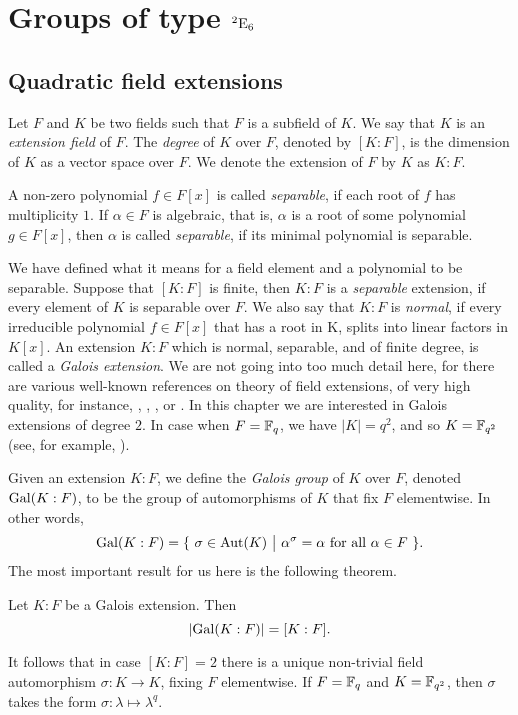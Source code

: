 \chapter{Groups of type ${}^2\mathord{\mathrm{E}}_6$}
\ifpdf
    \graphicspath{{Chapter3/Chapter3Figs/PNG/}{Chapter3/Chapter3Figs/PDF/}{Chapter3/Chapter3Figs/}}
\else
    \graphicspath{{Chapter3/Chapter3Figs/EPS/}{Chapter3/Chapter3Figs/}}
\fi

\section{Quadratic field extensions}

Let $F$ and $K$ be two fields such that $F$ is a subfield of $K$. We say that 
$K$ is an \textit{extension field} of $F$. The \textit{degree} of $K$ over $F$, 
denoted by $[K:F]$, is the dimension of $K$ as a vector space over $F$. We denote the
extension of $F$ by $K$ as $K : F$.

A non-zero polynomial $f \in F[x]$ is called \textit{separable}, if each root of $f$ has 
multiplicity $1$. If $\alpha \in F$ is algebraic, that is, $\alpha$ is a root of some polynomial
$g \in F[x]$, then $\alpha$ is called \textit{separable}, if its minimal polynomial is separable. 

We have defined what it means for a field element and a polynomial to be separable. Suppose that
$[K:F]$ is finite, then $K : F$ is a \textit{separable} extension, if every element of $K$ is 
separable over $F$. We also say that $K : F$ is \textit{normal}, if every irreducible 
polynomial $f \in F[x]$ that has a root in K, splits into linear factors in $K[x]$. An extension
$K : F$ which is normal, separable, and of finite degree, is called a \textit{Galois extension}.
We are not going into too much detail here, for there are various  well-known references on theory
of field extensions, of very high quality, for instance, \cite{PeterCameron}, \cite{DummitFoote}, \cite{Lang}, or \cite{Stewart}. In this chapter
we are interested in Galois extensions of degree $2$. 
In case when $F = \mathbb{F}_q$, we have $|K| = q^2$, and so $K = \mathbb{F}_{q^2}$ (see, for example, \cite{Moore}).

Given an extension $K : F$, we define the \textit{Galois group} of $K$ over $F$, denoted
$\mathrm{Gal}(K : F)$, to be the group
of automorphisms of $K$ that fix $F$ elementwise. In other words,
\begin{equation}
	\Gal(K : F) = \{\ \sigma \in \Aut(K)\ \big|\ \alpha^{\sigma} = \alpha\ \mbox{for all}\ 
		\alpha \in F\ \}.
\end{equation}
The most important result for us here is the following theorem.
\begin{theorem}
	Let $K : F$ be a Galois extension. Then
	\begin{equation}
		| \mathrm{Gal}(K : F) | = [K : F].
	\end{equation}
\end{theorem}
It follows that in case $[K:F] = 2$ there is a unique non-trivial field automorphism 
$\sigma : K \rightarrow K$, fixing $F$ elementwise. If $F = \mathbb{F}_q$ and $K = \mathbb{F}_{q^2}$, then
$\sigma$ takes the form $\sigma : \lambda \mapsto \lambda^q$. 

